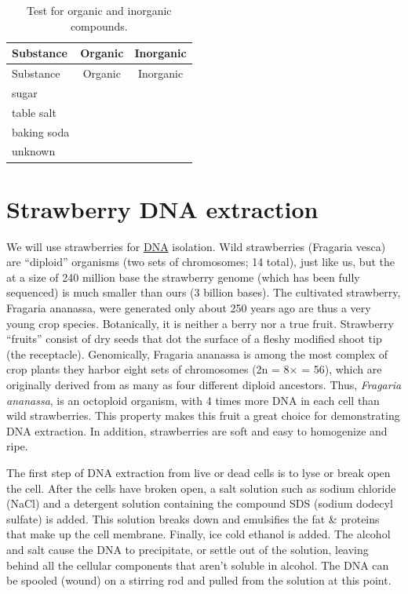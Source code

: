 \begin{longtable}[]{@{}lcc@{}}
\caption{\label{tab:organic} Test for organic and inorganic
compounds.}\tabularnewline
\toprule
Substance & Organic & Inorganic\tabularnewline
\midrule
\endfirsthead
\toprule
Substance & Organic & Inorganic\tabularnewline
\midrule
\endhead
sugar & &\tabularnewline
table salt & &\tabularnewline
baking soda & &\tabularnewline
unknown & &\tabularnewline
\bottomrule
\end{longtable}

\section{Strawberry DNA extraction}\label{strawberry-dna-extraction}

We will use strawberries for
\href{https://en.wikipedia.org/wiki/DNA}{DNA} isolation. Wild
strawberries (Fragaria vesca) are ``diploid'' organisms (two sets of
chromosomes; 14 total), just like us, but the at a size of 240 million
base the strawberry genome (which has been fully sequenced) is much
smaller than ours (3 billion bases). The cultivated strawberry, Fragaria
ananassa, were generated only about 250 years ago are thus a very young
crop species. Botanically, it is neither a berry nor a true fruit.
Strawberry ``fruits'' consist of dry seeds that dot the surface of a
fleshy modified shoot tip (the receptacle). Genomically, Fragaria
ananassa is among the most complex of crop plants they harbor eight sets
of chromosomes (2n = 8× = 56), which are originally derived from as many
as four different diploid ancestors. Thus, \emph{Fragaria ananassa}, is
an octoploid organism, with 4 times more DNA in each cell than wild
strawberries. This property makes this fruit a great choice for
demonstrating DNA extraction. In addition, strawberries are soft and
easy to homogenize and ripe.

The first step of DNA extraction from live or dead cells is to lyse or
break open the cell. After the cells have broken open, a salt solution
such as sodium chloride (NaCl) and a detergent solution containing the
compound SDS (sodium dodecyl sulfate) is added. This solution breaks
down and emulsifies the fat \& proteins that make up the cell membrane.
Finally, ice cold ethanol is added. The alcohol and salt cause the DNA
to precipitate, or settle out of the solution, leaving behind all the
cellular components that aren't soluble in alcohol. The DNA can be
spooled (wound) on a stirring rod and pulled from the solution at this
point.

